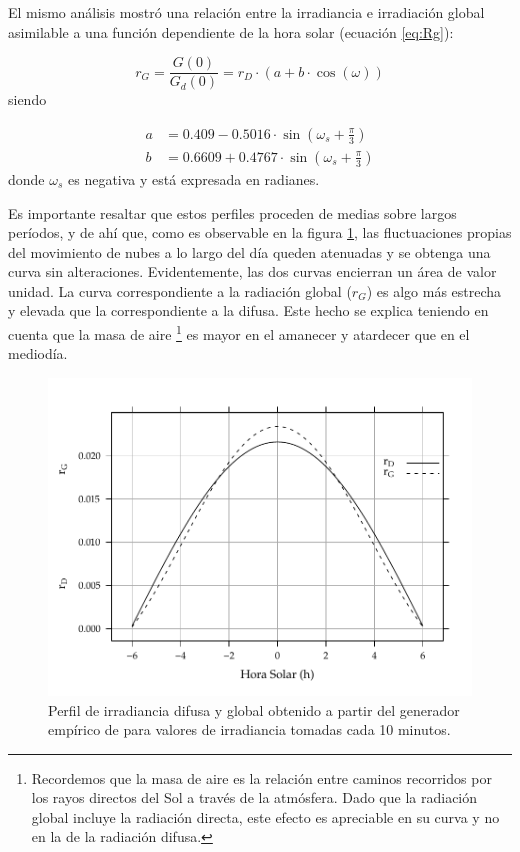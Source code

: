 El mismo análisis mostró una relación entre la irradiancia e irradiación
global asimilable a una función dependiente de la hora solar (ecuación
\ref{eq:Rg}):

\begin{equation}
r_{G}=\frac{G(0)}{G_{d}(0)}=r_{D}\cdot\left(a+b\cdot\cos(\omega)\right)\label{eq:Rg}\end{equation}
siendo

\begin{align}
a & =0.409-0.5016\cdot\sin(\omega_{s}+\frac{\pi}{3})\\
b & =0.6609+0.4767\cdot\sin(\omega_{s}+\frac{\pi}{3})
\end{align}
donde $\omega_s$ es negativa y está expresada en radianes.

Es importante resaltar que estos perfiles proceden de medias sobre
largos períodos, y de ahí que, como es observable en la figura \ref{fig:Perfil-de-irradiancia},
las fluctuaciones propias del movimiento de nubes a lo largo del día
queden atenuadas y se obtenga una curva sin alteraciones. Evidentemente,
las dos curvas encierran un área de valor unidad. La curva correspondiente
a la radiación global ($r_{G}$) es algo más estrecha y elevada que
la correspondiente a la difusa. Este hecho se explica teniendo en
cuenta que la masa de aire%
\footnote{Recordemos que la masa de aire es la relación entre caminos recorridos
por los rayos directos del Sol a través de la atmósfera. Dado que
la radiación global incluye la radiación directa, este efecto es apreciable
en su curva y no en la de la radiación difusa.%
} es mayor en el amanecer y atardecer que en el mediodía.


\begin{figure}
\begin{centering}
\includegraphics[scale=0.75]{../figs/RgRd}
\end{centering}

\caption{Perfil de irradiancia difusa y global obtenido a partir del generador
empírico de \cite{Collares-Pereira.Rabl1979} para valores de irradiancia
tomadas cada 10 minutos.\label{fig:Perfil-de-irradiancia} }

\end{figure}



